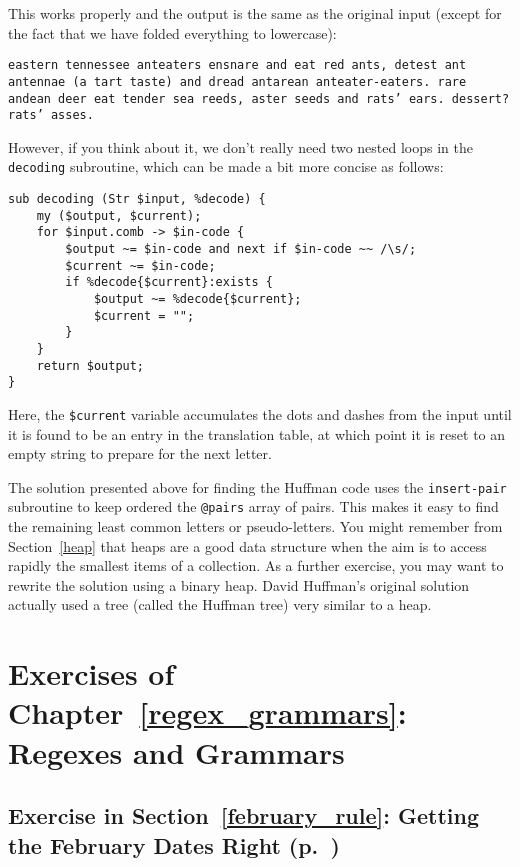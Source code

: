 This works properly and the output is the same as the original 
input (except for the fact that we have folded everything to 
lowercase):

\begin{verbatim}
eastern tennessee anteaters ensnare and eat red ants, detest ant
antennae (a tart taste) and dread antarean anteater-eaters. rare
andean deer eat tender sea reeds, aster seeds and rats’ ears. dessert?
rats’ asses.
\end{verbatim}

However, if you think about it, we don't really need two 
nested loops in the {\tt decoding} subroutine, which can be 
made a bit more concise as follows:

\begin{verbatim}
sub decoding (Str $input, %decode) {
    my ($output, $current);
    for $input.comb -> $in-code {
        $output ~= $in-code and next if $in-code ~~ /\s/;
        $current ~= $in-code;
        if %decode{$current}:exists {
            $output ~= %decode{$current};
            $current = "";
        }
    }
    return $output;
}
\end{verbatim}

Here, the \verb'$current' variable accumulates the dots and 
dashes from the input until it is found to be an entry in 
the translation table, at which point it is reset to an 
empty string to prepare for the next letter.

The solution presented above for finding the Huffman code 
uses the {\tt insert-pair} subroutine to keep ordered the 
\verb'@pairs' array of pairs. This makes it easy to find the remaining 
least common letters or pseudo-letters. You might remember 
from Section~\ref{heap} that heaps are a good data structure 
when the aim is to access rapidly the smallest items 
of a collection. As a further exercise, you may want to 
rewrite the solution using a binary heap. David Huffman's original 
solution actually used a tree (called the Huffman tree) very 
similar to a heap.


\section{Exercises of Chapter~\ref{regex_grammars}: Regexes and Grammars}

\subsection{Exercise in Section~\ref{february_rule}: Getting the February Dates Right (p.~\pageref{february_rule})}
\label{sol_february_rule}

